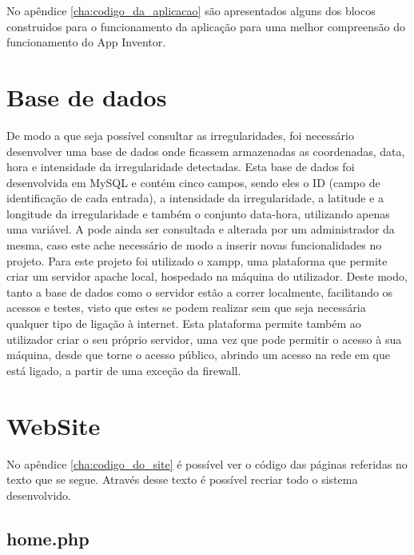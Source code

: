 No apêndice \ref{cha:codigo_da_aplicacao} são apresentados alguns dos blocos construidos para o funcionamento da aplicação para uma melhor compreensão do funcionamento do App Inventor.
\newpage

\section{Base de dados}
\label{sec:Base_de_dados}

De modo a que seja possível consultar as irregularidades, foi necessário desenvolver uma base de dados onde ficassem armazenadas as coordenadas, data, hora e intensidade da irregularidade detectadas.
Esta base de dados foi desenvolvida em MySQL e contém cinco campos, sendo eles o ID (campo de identificação de cada entrada), a intensidade da irregularidade, a latitude e a longitude da irregularidade e também o conjunto data-hora, utilizando apenas uma variável.
A pode ainda ser consultada e alterada por um administrador da mesma, caso este ache necessário de modo a inserir novas funcionalidades no projeto.
Para este projeto foi utilizado o xampp, uma plataforma que permite criar um servidor apache local, hospedado na máquina do utilizador.
Deste modo, tanto a base de dados como o servidor estão a correr localmente, facilitando os acessos e testes, visto que estes se podem realizar sem que seja necessária qualquer tipo de ligação à internet.
Esta plataforma permite também ao utilizador criar o seu próprio servidor, uma vez que pode permitir o acesso à sua máquina, desde que torne o acesso público, abrindo um acesso na rede em que está ligado, a partir de uma exceção da firewall.

\section{WebSite}
\label{sec:website}

No apêndice \ref{cha:codigo_do_site} é possível ver o código das páginas referidas no texto que se segue.
Através desse texto é possível recriar todo o sistema desenvolvido.

\subsection{home.php}
\label{sub:home.php}

